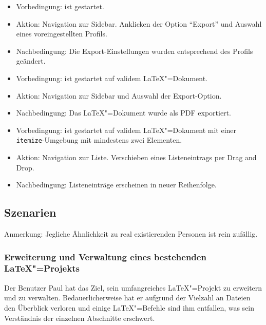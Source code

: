 
\begin{itemize}
\item Vorbedingung: \texla{} ist gestartet.
  \item Aktion: Navigation zur Sidebar.
  Anklicken der Option \enquote{Export} und Auswahl eines voreingestellten Profils.
  \item Nachbedingung: Die Export-Einstellungen wurden entsprechend des Profils geändert.

\end{itemize}

\begin{itemize}
\item Vorbedingung: \texla{} ist gestartet auf validem \LaTeX"=Dokument.
  \item Aktion: Navigation zur Sidebar und Auswahl der Export-Option.
  \item Nachbedingung: Das \LaTeX"=Dokument wurde als PDF exportiert.

\end{itemize}

\begin{itemize}
\item Vorbedingung: \texla{} ist gestartet auf validem \LaTeX"=Dokument mit einer \verb|itemize|-Umgebung mit
  mindestens zwei Elementen.
  \item Aktion: Navigation zur Liste.
  Verschieben eines Listeneintrags per Drag and Drop.
  \item Nachbedingung: Listeneinträge erscheinen in neuer Reihenfolge.

\end{itemize}
\subsection{Szenarien}
\label{subsec:tests-scenarios}
Anmerkung: Jegliche Ähnlichkeit zu real existierenden Personen ist rein zufällig.

\subsubsection{Erweiterung und Verwaltung eines bestehenden \LaTeX"=Projekts}
Der Benutzer Paul hat das Ziel, sein umfangreiches \LaTeX"=Projekt zu erweitern und zu verwalten.
Bedauerlicherweise hat er aufgrund der Vielzahl an Dateien den Überblick verloren und einige \LaTeX"=Befehle sind
ihm entfallen, was sein Verständnis der einzelnen Abschnitte erschwert.

